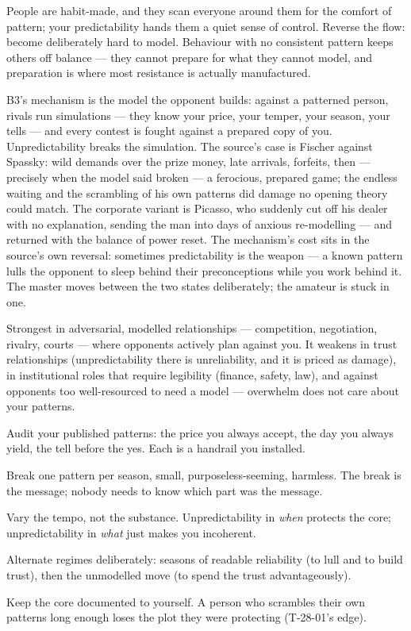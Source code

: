 \begin{core}
People are habit-made, and they scan everyone around them for the comfort of pattern; your predictability hands them a quiet sense of control. Reverse the flow: become deliberately hard to model. Behaviour with no consistent pattern keeps others off balance --- they cannot prepare for what they cannot model, and preparation is where most resistance is actually manufactured.
\end{core}
\begin{mechanism}
B3's mechanism is the model the opponent builds: against a patterned person, rivals run simulations --- they know your price, your temper, your season, your tells --- and every contest is fought against a prepared copy of you. Unpredictability breaks the simulation. The source's case is Fischer against Spassky: wild demands over the prize money, late arrivals, forfeits, then --- precisely when the model said broken --- a ferocious, prepared game; the endless waiting and the scrambling of his own patterns did damage no opening theory could match. The corporate variant is Picasso, who suddenly cut off his dealer with no explanation, sending the man into days of anxious re-modelling --- and returned with the balance of power reset. The mechanism's cost sits in the source's own reversal: sometimes predictability is the weapon --- a known pattern lulls the opponent to sleep behind their preconceptions while you work behind it. The master moves between the two states deliberately; the amateur is stuck in one.
\end{mechanism}
\begin{conditions}
Strongest in adversarial, modelled relationships --- competition, negotiation, rivalry, courts --- where opponents actively plan against you. It weakens in trust relationships (unpredictability there is unreliability, and it is priced as damage), in institutional roles that require legibility (finance, safety, law), and against opponents too well-resourced to need a model --- overwhelm does not care about your patterns.
\end{conditions}
\begin{application}
  \item Audit your published patterns: the price you always accept, the day you always yield, the tell before the yes. Each is a handrail you installed.
  \item Break one pattern per season, small, purposeless-seeming, harmless. The break is the message; nobody needs to know which part was the message.
  \item Vary the tempo, not the substance. Unpredictability in \emph{when} protects the core; unpredictability in \emph{what} just makes you incoherent.
  \item Alternate regimes deliberately: seasons of readable reliability (to lull and to build trust), then the unmodelled move (to spend the trust advantageously).
  \item Keep the core documented to yourself. A person who scrambles their own patterns long enough loses the plot they were protecting (T-28-01's edge).
\end{application}

